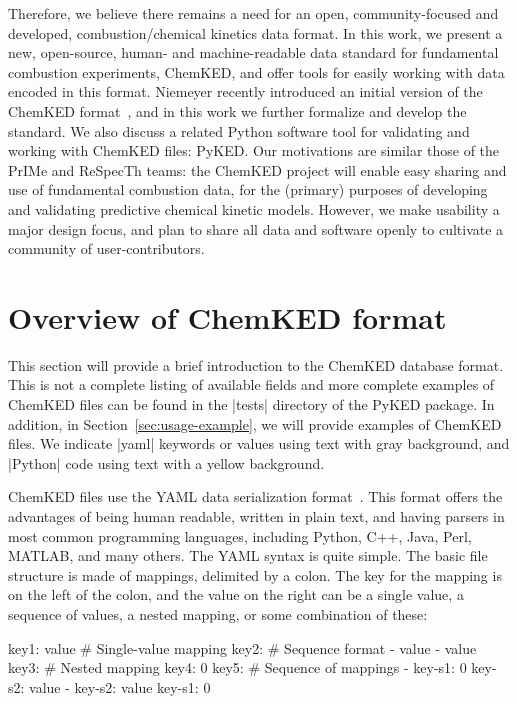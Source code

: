 \documentclass[12pt]{ijck}
\newcommand\ck{ChemKED}
\newcommand\pk{PyKED}
\begin{document}
Therefore, we believe there remains a need for an open, community-focused and
developed, combustion\slash chemical kinetics data format. In this work, we
present a new, open-source, human- and machine-readable data standard for
fundamental combustion experiments, \ck{}, and offer tools for easily working
with data encoded in this format. Niemeyer recently introduced an initial
version of the \ck{} format~\autocite{Niemeyer:2016wf}, and in this work we
further formalize and develop the standard. We also discuss a related Python
software tool for validating and working with \ck{} files: \pk{}. Our
motivations are similar those of the PrIMe and ReSpecTh teams: the \ck{} project
will enable easy sharing and use of fundamental combustion data, for the
(primary) purposes of developing and validating predictive chemical kinetic
models. However, we make usability a major design focus, and plan to share all
data and software openly to cultivate a community of user-contributors.

\section{Overview of ChemKED format}\label{sec:overview-of-format}

This section will provide a brief introduction to the \ck{} database format.
This is not a complete listing of available fields and more complete examples of
\ck{} files can be found in the \pybox|tests| directory of the \pk{} package. In
addition, in Section~\ref{sec:usage-example}, we will provide examples of \ck{}
files. We indicate \yabox|yaml| keywords or values using text with gray background,
and \pybox|Python| code using text with a yellow background.

\ck{} files use the YAML data serialization format~\autocite{yaml:1.2}. This
format offers the advantages of being human readable, written in plain text, and
having parsers in most common programming languages, including Python, C++, Java,
Perl, MATLAB, and many others. The YAML syntax is quite simple. The basic file
structure is made of mappings, delimited by a colon. The key for the mapping is
on the left of the colon, and the value on the right can be a single value,
a sequence of values, a nested mapping, or some combination of these:
%
\begin{yamlbox}
key1: value  # Single-value mapping
key2:  # Sequence format
  - value
  - value
key3:  # Nested mapping
  key4: 0
key5:  # Sequence of mappings
  - key-s1: 0
    key-s2: value
  - key-s2: value
    key-s1: 0
\end{yamlbox}
\end{document}
